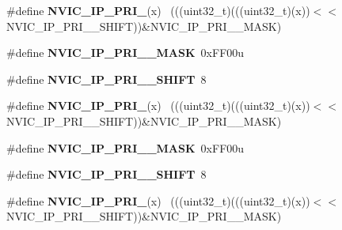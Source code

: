 \begin{DoxyCompactItemize}
\item 
\hypertarget{group___n_v_i_c___register___masks_gaa640821c59b04fb5277034eef3c723c9}{}\#define {\bfseries N\+V\+I\+C\+\_\+\+I\+P\+\_\+\+P\+R\+I\+\_}(x)                                            ~(((uint32\+\_\+t)(((uint32\+\_\+t)(x))$<$$<$N\+V\+I\+C\+\_\+\+I\+P\+\_\+\+P\+R\+I\+\_\+\_\+\+S\+H\+I\+F\+T))\&N\+V\+I\+C\+\_\+\+I\+P\+\_\+\+P\+R\+I\+\_\+\_\+\+M\+A\+S\+K)\label{group___n_v_i_c___register___masks_gaa640821c59b04fb5277034eef3c723c9}

\item 
\hypertarget{group___n_v_i_c___register___masks_ga814cd4772457cb9ecbbca3e920fd137e}{}\#define {\bfseries N\+V\+I\+C\+\_\+\+I\+P\+\_\+\+P\+R\+I\+\_\+\_\+\+M\+A\+S\+K}~0x\+F\+F00u\label{group___n_v_i_c___register___masks_ga814cd4772457cb9ecbbca3e920fd137e}

\item 
\hypertarget{group___n_v_i_c___register___masks_ga04e4114079b0bdec123a9ec1cbf753ac}{}\#define {\bfseries N\+V\+I\+C\+\_\+\+I\+P\+\_\+\+P\+R\+I\+\_\+\_\+\+S\+H\+I\+F\+T}~8\label{group___n_v_i_c___register___masks_ga04e4114079b0bdec123a9ec1cbf753ac}

\item 
\hypertarget{group___n_v_i_c___register___masks_gae8757ec0ce6792ef8b753d66ae926b93}{}\#define {\bfseries N\+V\+I\+C\+\_\+\+I\+P\+\_\+\+P\+R\+I\+\_}(x)                                            ~(((uint32\+\_\+t)(((uint32\+\_\+t)(x))$<$$<$N\+V\+I\+C\+\_\+\+I\+P\+\_\+\+P\+R\+I\+\_\+\_\+\+S\+H\+I\+F\+T))\&N\+V\+I\+C\+\_\+\+I\+P\+\_\+\+P\+R\+I\+\_\+\_\+\+M\+A\+S\+K)\label{group___n_v_i_c___register___masks_gae8757ec0ce6792ef8b753d66ae926b93}

\item 
\hypertarget{group___n_v_i_c___register___masks_ga0c51910ba3a4a9024cc9ad093faac6c2}{}\#define {\bfseries N\+V\+I\+C\+\_\+\+I\+P\+\_\+\+P\+R\+I\+\_\+\_\+\+M\+A\+S\+K}~0x\+F\+F00u\label{group___n_v_i_c___register___masks_ga0c51910ba3a4a9024cc9ad093faac6c2}

\item 
\hypertarget{group___n_v_i_c___register___masks_ga9e589d5827b433115674feea8762dc20}{}\#define {\bfseries N\+V\+I\+C\+\_\+\+I\+P\+\_\+\+P\+R\+I\+\_\+\_\+\+S\+H\+I\+F\+T}~8\label{group___n_v_i_c___register___masks_ga9e589d5827b433115674feea8762dc20}

\item 
\hypertarget{group___n_v_i_c___register___masks_ga26a6c9accb8900ba18cfd32f4e730fef}{}\#define {\bfseries N\+V\+I\+C\+\_\+\+I\+P\+\_\+\+P\+R\+I\+\_}(x)                                              ~(((uint32\+\_\+t)(((uint32\+\_\+t)(x))$<$$<$N\+V\+I\+C\+\_\+\+I\+P\+\_\+\+P\+R\+I\+\_\+\_\+\+S\+H\+I\+F\+T))\&N\+V\+I\+C\+\_\+\+I\+P\+\_\+\+P\+R\+I\+\_\+\_\+\+M\+A\+S\+K)\label{group___n_v_i_c___register___masks_ga26a6c9accb8900ba18cfd32f4e730fef}


\end{DoxyCompactItemize}
